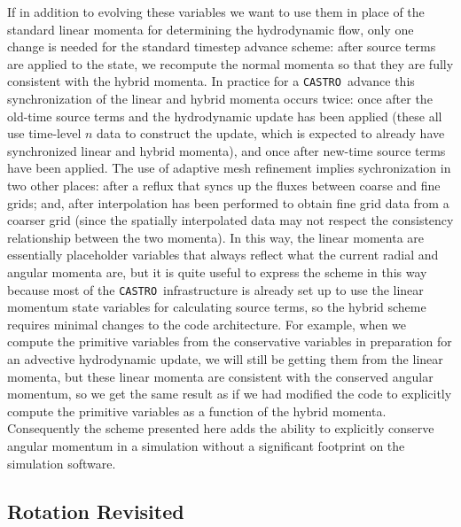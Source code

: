 \documentclass[twocolumn,numberedappendix]{../aastex6}
\newcommand{\castro}{\texttt{CASTRO}}
\begin{document}
If in addition to evolving these variables we want to use them in place of the
standard linear momenta for determining the hydrodynamic flow, only one change
is needed for the standard timestep advance scheme: after source terms are
applied to the state, we recompute the normal momenta so that they are fully
consistent with the hybrid momenta. In practice for a \castro\ advance this
synchronization of the linear and hybrid momenta occurs twice: once after the
old-time source terms and the hydrodynamic update has been applied (these all
use time-level $n$ data to construct the update, which is expected to already have
synchronized linear and hybrid momenta), and once after new-time source
terms have been applied. The use of adaptive mesh refinement implies sychronization
in two other places: after a reflux that syncs up the fluxes between coarse and
fine grids; and, after interpolation has been performed to obtain fine grid data
from a coarser grid (since the spatially interpolated data may not respect the
consistency relationship between the two momenta). In this way, the linear momenta
are essentially placeholder variables that always reflect what the current radial
and angular momenta are, but it is quite useful to express the scheme in this way
because most of the \castro\ infrastructure is already set up to use the linear
momentum state variables for calculating source terms, so the hybrid scheme requires
minimal changes to the code architecture. For example, when we compute
the primitive variables from the conservative variables in preparation for an advective
hydrodynamic update, we will still be getting them from the linear momenta,
but these linear momenta are consistent with the conserved angular momentum,
so we get the same result as if we had modified the code to explicitly compute
the primitive variables as a function of the hybrid momenta. Consequently the
scheme presented here adds the ability to explicitly conserve angular momentum
in a simulation without a significant footprint on the simulation software.



\subsection{Rotation Revisited}\label{sec:rotation}
\end{document}
